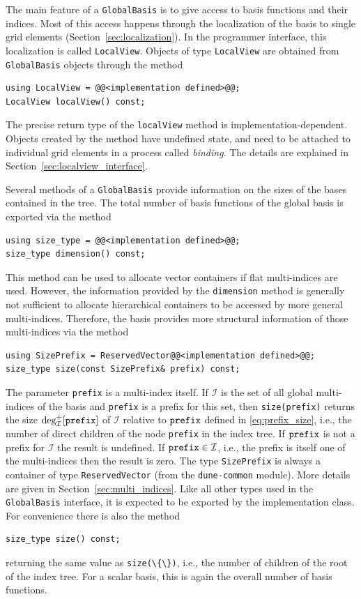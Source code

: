 \documentclass[a4paper,10pt,headings=normal,bibliography=totoc]{scrartcl}
\newcommand{\cpp}[1]{\lstinline[basicstyle=\ttfamily]!#1!}
\newcommand{\dunemodule}[1]{\texttt{#1}}
\begin{document}
The main feature of a \cpp{GlobalBasis} is to give access to basis functions and their indices.
Most of this access happens through the localization of the basis to single grid elements (Section~\ref{sec:localization}).
In the programmer interface, this localization is called \cpp{LocalView}.  Objects of type
\cpp{LocalView} are obtained from \cpp{GlobalBasis} objects through the method
\begin{lstlisting}[style=Interface]
using LocalView = @@<implementation defined>@@;
LocalView localView() const;
\end{lstlisting}
The precise return type of the \cpp{localView} method is implementation-dependent. Objects
created by the method have undefined state, and need to be attached to individual grid
elements in a process called \emph{binding}.
The details are explained in Section~\ref{sec:localview_interface}.

Several methods of a \cpp{GlobalBasis} provide information on the sizes of the bases
contained in the tree.
The total number of basis functions of the global basis is
exported via the method
\begin{lstlisting}[style=Interface]
using size_type = @@<implementation defined>@@;
size_type dimension() const;
\end{lstlisting}
This method can be used to allocate vector containers if flat multi-indices are used.
However, the information provided by the \cpp{dimension} method is generally not
sufficient to allocate hierarchical containers to be
accessed by more general multi-indices.
Therefore, the basis provides more structural
information of those multi-indices via the method
\begin{lstlisting}[style=Interface]
using SizePrefix = ReservedVector@@<implementation defined>@@;
size_type size(const SizePrefix& prefix) const;
\end{lstlisting}
The parameter \cpp{prefix} is a multi-index itself.
If $\mathcal{I}$ is the set of all global multi-indices of the
basis and \cpp{prefix} is a prefix for this set, then
\cpp{size(prefix)} returns the size $\operatorname{deg}^+_{\mathcal{I}}[\text{\cpp{prefix}}]$ of
$\mathcal{I}$ relative to $\text{\cpp{prefix}}$ defined in \eqref{eq:prefix_size},
i.e., the number of direct children of the node \cpp{prefix} in the index tree.
If $\text{\cpp{prefix}}$ is not a prefix for $\mathcal{I}$ the result is undefined.
If $\text{\cpp{prefix}} \in \mathcal{I}$, i.e., the prefix is itself one of the multi-indices
then the result is zero.
The type \cpp{SizePrefix} is always a container of type \cpp{ReservedVector} (from the
\dunemodule{dune-common} module).  More details are given in Section~\ref{sec:multi_indices}.
Like all other types used in the \cpp{GlobalBasis} interface, it is expected to be
exported by the implementation class.
For convenience there is also the method
\begin{lstlisting}[style=Interface]
size_type size() const;
\end{lstlisting}
returning the same value as \cpp{size(\{\})}, i.e., the number of children of the root of
the index tree.
For a scalar basis, this is again the overall number of basis functions.
\end{document}
